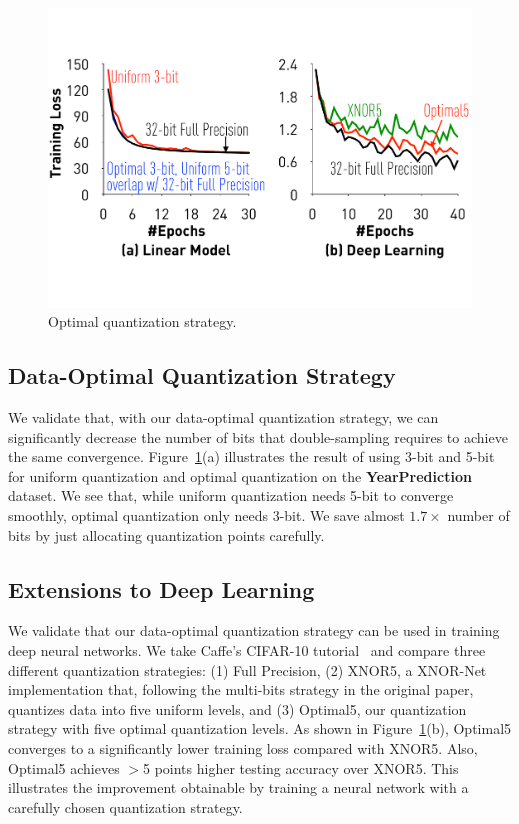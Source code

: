 \documentclass{article}
\begin{document}
\begin{figure}[t]
\centering
\includegraphics[width=0.8\columnwidth]{final-experiments/optimal} 
\caption{Optimal quantization strategy.}
\label{fig:optimal}
\end{figure}

\subsection{Data-Optimal Quantization Strategy}

We validate that, with our data-optimal quantization strategy, we can 
significantly decrease the number of 
bits that double-sampling requires to 
achieve the same convergence.
Figure~\ref{fig:optimal}(a) illustrates
the result of using 3-bit and 5-bit
for uniform quantization and optimal 
quantization on the {\bf YearPrediction}
dataset. We see that,
while uniform quantization needs 5-bit
to converge smoothly, optimal
quantization only needs 3-bit. 
We save almost $1.7\times$ number of 
bits by just allocating quantization points carefully.

\subsection{Extensions to Deep Learning}

We validate that our data-optimal quantization
strategy can be used in training deep neural
networks. We take Caffe's CIFAR-10 tutorial~\cite{Caffe:CIFAR10}
and compare three different quantization
strategies: (1) Full Precision, (2) XNOR5, 
a XNOR-Net implementation that, following
the multi-bits strategy in
the original paper, quantizes data into
five uniform levels, and (3)
Optimal5, our quantization strategy with
five optimal quantization levels. As
shown in Figure~\ref{fig:optimal}(b), Optimal5
converges to a significantly lower training 
loss compared with XNOR5. Also,
Optimal5 achieves $>$5 points higher testing accuracy over XNOR5.
This illustrates the improvement
obtainable by training a neural network with
a carefully chosen quantization strategy.
\end{document}
